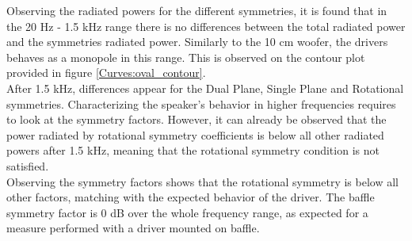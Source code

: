 \documentclass{report}
\begin{document}
Observing the radiated powers for the different symmetries, it is found that in the 20 Hz - 1.5 kHz range there is no differences between the total radiated power and the symmetries radiated power. Similarly to the 10 cm woofer, the drivers behaves as a monopole in this range. This is observed on the contour plot provided in figure \ref{Curves:oval_contour}. \\
After 1.5 kHz, differences appear for the Dual Plane, Single Plane and Rotational symmetries. Characterizing the speaker's behavior in higher frequencies requires to look at the symmetry factors. However, it can already be observed that the power radiated by rotational symmetry coefficients is below all other radiated powers after 1.5 kHz, meaning that the rotational symmetry condition is not satisfied. \\

Observing the symmetry factors shows that the rotational symmetry is below all other factors, matching with the expected behavior of the driver. The baffle symmetry factor is 0 dB over the whole frequency range, as expected for a measure performed with a driver mounted on baffle.\\
\end{document}
